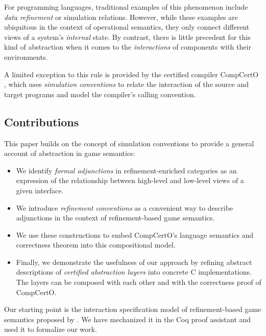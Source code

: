 \documentclass[sigplan,10pt,authordraft]{acmart}
\begin{document}

For programming languages,
traditional examples of this phenomenon include
\emph{data refinement} \cite{dataref}
or simulation relations.
However,
while these examples
are ubiquitous in the context of operational semantics,
they only connect different views of
a system's \emph{internal} state.
%
By contrast,
there is little precedent
for this kind of abstraction
when it comes to the \emph{interactions} of
components with their environments.

A limited exception to this rule
is provided by the certified compiler CompCertO \cite{compcerto},
which uses \emph{simulation conventions}
to relate the interaction of the source and target programs
and model the compiler's calling convention.

\subsection{Contributions}

This paper builds on the concept of simulation conventions
to provide a general account of abstraction
in game semantics:
\begin{itemize}
  \item We identify \emph{formal adjunctions} in
    refinement-enriched categories
    as an expression of the relationship
    between high-level and low-level views
    of a given interface.
  \item We introduce \emph{refinement conventions}
    as a convenient way to describe adjunctions
    in the context of refinement-based game semantics.
  \item We use these constructions to
    embed CompCertO's language semantics
    and correctness theorem into this
    compositional model.
  \item Finally, we demonstrate the usefulness
    of our approach by refining abstract descriptions of
    \emph{certified abstraction layers}
    into concrete C implementations.
    The layers can be composed with each other
    and with the correctness proof of CompCertO.
\end{itemize}
Our starting point is
the interaction specification model
of refinement-based game semantics
proposed by \citet{rbgs-cal}.
We have mechanized it in the Coq proof assistant
and used it to formalize our work.
\end{document}
